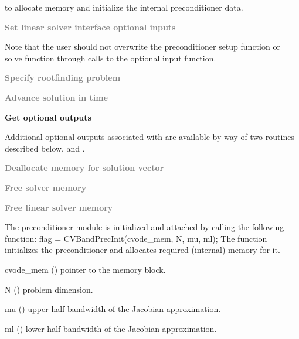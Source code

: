 \begin{Steps}

  to allocate memory and initialize the internal preconditioner data.

\item
  \textcolor{gray}{\bf Set linear solver interface optional inputs}

  Note that the user should not overwrite the preconditioner setup function
  or solve function through calls to the 
  optional input function.

\item
  \textcolor{gray}{\bf Specify rootfinding problem}

\item
  \textcolor{gray}{\bf Advance solution in time}

\item
  {\bf Get optional outputs}

  Additional optional outputs associated with {\cvbandpre} are available by 
  way of two routines described below,
   and .

\item
  \textcolor{gray}{\bf Deallocate memory for solution vector}

\item
  \textcolor{gray}{\bf Free solver memory}

\item
  \textcolor{gray}{\bf Free linear solver memory}

\end{Steps}
The {\cvbandpre} preconditioner module is initialized and attached
by calling the following function:
{
  flag = CVBandPrecInit(cvode\_mem, N, mu, ml);
}
{
  The function  initializes the {\cvbandpre} preconditioner
  and allocates required (internal) memory for it.
}
{
  \begin{args}
  \item[cvode\_mem] ()
    pointer to the {\cvode} memory block.
  \item[N] ()
    problem dimension.
  \item[mu] ()
    upper half-bandwidth of the Jacobian approximation.
  \item[ml] ()
    lower half-bandwidth of the Jacobian approximation.
  \end{args}
}
